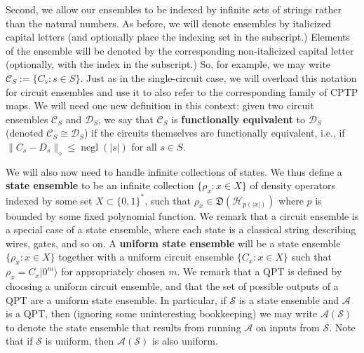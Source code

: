 \documentclass[envcountsame]{llncs}
\numberwithin{equation}{section}
\newcommand{\opn}{\operatorname}
\newcommand{\algo}{\mathcal}
\newcommand{\negl}{\opn{negl}}
\newcommand{\states}{\mathfrak D}
\begin{document}
Second, we allow our ensembles to be indexed by infinite sets of strings rather than the natural numbers. As before, we will denote ensembles by italicized capital letters (and optionally place the indexing set in the subscript.) Elements of the ensemble will be denoted by the corresponding non-italicized capital letter (optionally, with the index in the subscript.) So, for example, we may write $\mathcal C_S := \{C_s : s \in S\}$. Just as in the single-circuit case, we will overload this notation for circuit ensembles and use it to also refer to the corresponding family of CPTP maps. We will need one new definition in this context: given two circuit ensembles $\mathcal C_S$ and $\mathcal D_S$, we say that $\mathcal C_S$ is \textbf{functionally equivalent} to $\mathcal D_S$ (denoted $\mathcal C_S \cong \mathcal D_S$) if the circuits themselves are functionally equivalent, i.e., if $\|C_s - D_s\|_\diamond \leq \negl(|s|)$ for all $s \in S$. 

We will also now need to handle infinite collections of states. We thus define a \textbf{state ensemble} to be an infinite collection $\{\rho_x : x \in X\}$ of density operators indexed by some set $X \subset \{0, 1\}^*$, such that $\rho_x \in \states(\mathcal H_{p(|x|)})$ where $p$ is bounded by some fixed polynomial function. We remark that a circuit ensemble is a special case of a state ensemble, where each state is a classical string describing wires, gates, and so on. A \textbf{uniform state ensemble} will be a state ensemble $\{\rho_x : x \in X\}$ together with a uniform circuit ensemble $\{C_x : x \in X\}$ such that $\rho_x = C_x |0^m\rangle$ for appropriately chosen $m$. We remark that a QPT is defined by choosing a uniform circuit ensemble, and that the set of possible outputs of a QPT are a uniform state ensemble. In particular, if $\mathcal S$ is a state ensemble and $\algo A$ is a QPT, then (ignoring some uninteresting bookkeeping) we may write $\algo A(\mathcal S)$ to denote the state ensemble that results from running $\algo A$ on inputs from $\mathcal S$. Note that if $\mathcal S$ is uniform, then $\algo A(\mathcal S)$ is also uniform.
\end{document}

